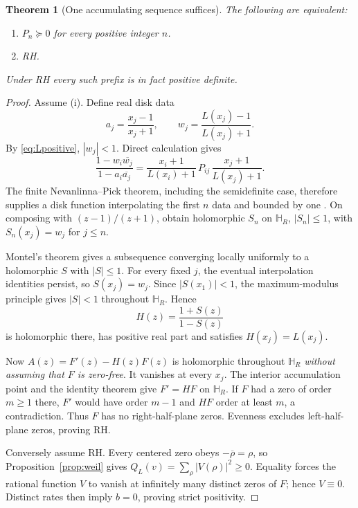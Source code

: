 \documentclass[11pt,letterpaper]{article}
\newtheorem{theorem}{Theorem}[section]
\theoremstyle{definition}
\theoremstyle{remark}
\newcommand{\HH}{\mathbb H_R}
\newcommand{\abs}[1]{\left\lvert#1\right\rvert}
\numberwithin{equation}{section}
\begin{document}
\begin{theorem}[One accumulating sequence suffices]\label{thm:sparse}
The following are equivalent:
\begin{enumerate}[label=(\roman*)]
\item $P_n\succeq0$ for every positive integer $n$.
\item RH.
\end{enumerate}
Under RH every such prefix is in fact positive definite.
\end{theorem}
\begin{proof}
Assume (i). Define real disk data
\[
 a_j=\frac{x_j-1}{x_j+1},\qquad
 w_j=\frac{L(x_j)-1}{L(x_j)+1}.
\]
By \eqref{eq:Lpositive}, $\abs{w_j}<1$. Direct calculation gives
\begin{equation}\label{eq:cayley}
 \frac{1-w_i\overline{w_j}}{1-a_i\overline{a_j}}
 =\frac{x_i+1}{L(x_i)+1}\,P_{ij}\,
  \frac{x_j+1}{L(x_j)+1}.
\end{equation}
The finite Nevanlinna--Pick theorem, including the semidefinite case, therefore supplies a disk function interpolating the first $n$ data and bounded by one \cite{agler}. On composing with $(z-1)/(z+1)$, obtain holomorphic $S_n$ on $\HH$, $\abs{S_n}\le1$, with $S_n(x_j)=w_j$ for $j\le n$.

Montel's theorem gives a subsequence converging locally uniformly to a holomorphic $S$ with $\abs S\le1$. For every fixed $j$, the eventual interpolation identities persist, so $S(x_j)=w_j$. Since $\abs{S(x_1)}<1$, the maximum-modulus principle gives $\abs S<1$ throughout $\HH$. Hence
\[
 H(z)=\frac{1+S(z)}{1-S(z)}
\]
is holomorphic there, has positive real part and satisfies $H(x_j)=L(x_j)$.

Now $A(z)=F'(z)-H(z)F(z)$ is holomorphic throughout $\HH$ \emph{without assuming that $F$ is zero-free}. It vanishes at every $x_j$. The interior accumulation point and the identity theorem give $F'=HF$ on $\HH$. If $F$ had a zero of order $m\ge1$ there, $F'$ would have order $m-1$ and $HF$ order at least $m$, a contradiction. Thus $F$ has no right-half-plane zeros. Evenness excludes left-half-plane zeros, proving RH.

Conversely assume RH. Every centered zero obeys $-\overline\rho=\rho$, so Proposition~\ref{prop:weil} gives $Q_L(v)=\sum_\rho\abs{V(\rho)}^2\ge0$. Equality forces the rational function $V$ to vanish at infinitely many distinct zeros of $F$; hence $V\equiv0$. Distinct rates then imply $b=0$, proving strict positivity.
\end{proof}
\end{document}
